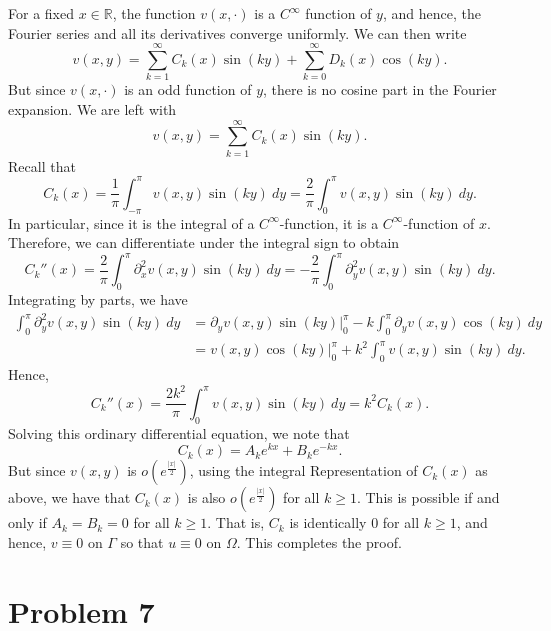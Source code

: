 \documentclass[10pt]{amsart}
\theoremstyle{thmstyle}
\theoremstyle{defstyle}
\newcommand{\R}{\mathbb{R}}
\renewcommand{\ge}{\geqslant}
\begin{document}
For a fixed $x\in\R$, the function $v(x,\cdot)$ is a $C^\infty$ function of $y$, and hence, the Fourier series and all its derivatives converge uniformly. We can then write 
\begin{equation*}
    v(x, y) = \sum_{k = 1}^\infty C_k(x)\sin(ky) + \sum_{k = 0}^\infty D_k(x)\cos(ky).
\end{equation*}
But since $v(x,\cdot)$ is an odd function of $y$, there is no cosine part in the Fourier expansion. We are left with 
\begin{equation*}
    v(x, y) = \sum_{k = 1}^{\infty}C_k(x)\sin(ky).
\end{equation*}
Recall that 
\begin{equation*}
    C_k(x) = \frac{1}{\pi}\int_{-\pi}^\pi v(x, y)\sin(ky)~dy = \frac{2}{\pi}\int_{0}^\pi v(x,y)\sin(ky)~dy.
\end{equation*}
In particular, since it is the integral of a $C^\infty$-function, it is a $C^\infty$-function of $x$. Therefore, we can differentiate under the integral sign to obtain 
\begin{equation*}
    C_k''(x) = \frac{2}{\pi}\int_0^\pi \partial_x^2 v(x,y)\sin(ky)~dy = -\frac{2}{\pi}\int_0^\pi \partial_y^2 v(x,y)\sin(ky)~dy.
\end{equation*}
Integrating by parts, we have 
\begin{align*}
    \int_0^\pi\partial_y^2 v(x,y)\sin(ky)~dy &= \partial_y v(x,y)\sin(ky)\bigg\vert_0^\pi - k\int_0^\pi \partial_y v(x,y)\cos(ky)~dy\\
    &= v(x,y)\cos(ky)\bigg\vert_0^\pi + k^2\int_0^\pi v(x,y)\sin(ky)~dy.
\end{align*}
Hence, 
\begin{equation*}
    C_k''(x) = \frac{2k^2}{\pi}\int_0^\pi v(x,y)\sin(ky)~dy = k^2C_k(x).
\end{equation*}
Solving this ordinary differential equation, we note that 
\begin{equation*}
    C_k(x) = A_ke^{kx} + B_ke^{-kx}.
\end{equation*}
But since $v(x, y)$ is $o(e^{\frac{|x|}{2}})$, using the integral Representation of $C_k(x)$ as above, we have that $C_k(x)$ is also $o(e^{\frac{|x|}{2}})$ for all $k\ge 1$. This is possible if and only if $A_k = B_k = 0$ for all $k\ge 1$. That is, $C_k$ is identically $0$ for all $k\ge 1$, and hence, $v\equiv 0$ on $\Gamma$ so that $u\equiv 0$ on $\Omega$. This completes the proof.

\section{Problem 7}
\end{document}
